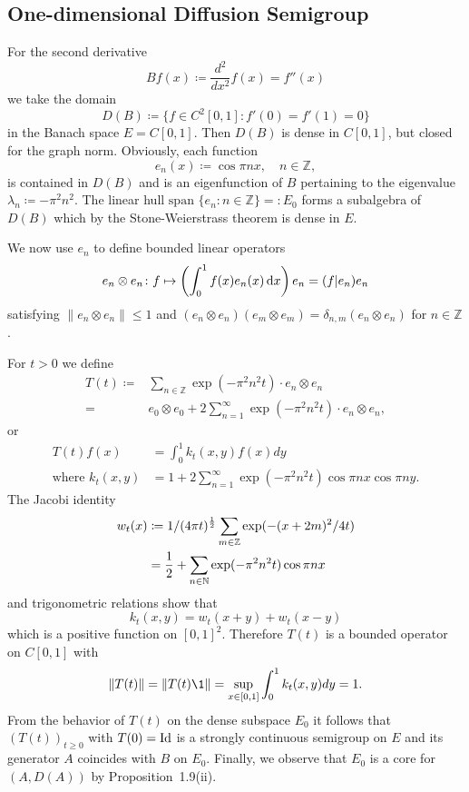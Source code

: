 \subsection{One-dimensional Diffusion Semigroup}\label{subsec:a1-2.7}%
For the second derivative 
\[
    Bf(x) \coloneqq \frac{d^{2}}{dx^{2}}f(x) = f''(x)
\]
we take the domain
\[
    D(B) \coloneqq \{f \in C^{2}\left[ 0,1 \right] \colon f'(0) = f'(1) = 0\}
\]
in the Banach space $E = C\left[ 0,1 \right]$.
Then $D(B)$ is dense in $C\left[ 0,1 \right]$, but closed for the graph norm.
Obviously, each function
\[
    e_{n}(x) \coloneqq \cos \pi nx, \quad n \in \mathbb{Z},
\]
is contained in $D(B)$ and is an eigenfunction of $B$ pertaining to the eigenvalue $\lambda_{n} \coloneqq -\pi^{2}n^{2}$.
The linear hull $\text{span }\{e_{n} \colon n \in \mathbb{Z}\} = \colon E_{0}$ forms a subalgebra of $D(B)$ which by the Stone-Weierstrass theorem is dense in $E$.

We now use $e_{n}$ to define bounded linear operators 
\[
	e_{n} \otimes e_{n} \colon f \mapsto \left(\int_{0}^{1} f(x)e_{n}(x) \dx \right)e_{n} 
		= ( f | e_{n} ) e_{n} %
\]
satisfying $\|e_{n} \otimes e_{n}\| \leq 1$ and
$(e_{n} \otimes e_{n})(e_{m} \otimes e_{m}) = \delta_{n,m}(e_{n} \otimes e_{n})$ for $n \in \mathbb{Z}$.

For $t > 0$ we define
\begin{align*}
T(t) \coloneqq{}& \sum_{n \in \mathbb{Z}} \exp(-\pi^{2}n^{2}t) \cdot e_{n} \otimes e_{n} \\
		={}& e_{0} \otimes e_{0} + 2\sum_{n=1}^{\infty} \exp(-\pi^{2}n^{2}t) \cdot e_{n} \otimes e_{n},
\end{align*}
or
\begin{align*}
    T(t)f(x) &= \int_{0}^{1} k_{t}(x,y)f(x)dy \\
    \text{where } k_{t}(x,y) &= 1 + 2\sum_{n=1}^{\infty} \exp(-\pi^{2}n^{2}t) \cos\pi nx \cos\pi ny .
\end{align*}
The Jacobi identity
\begin{align*}
    w_{t}(x) &\coloneqq 1/(4\pi t)^{\frac{1}{2}} \sum_{m \in \mathbb{Z}} \exp(-(x+2m)^{2}/4t) \\
    &= \frac{1}{2} + \sum_{n \in \mathbb{N}} \exp(-\pi^{2}n^{2}t) \cos\pi nx
\end{align*}
and trigonometric relations show that
\[
    k_{t}(x,y) = w_{t}(x+y) + w_{t}(x-y)
\]
which is a positive function on $\left[ 0,1 \right]^{2}$.
Therefore $T(t)$ is a bounded operator on $C\left[ 0,1 \right]$ with
\[
    \|T(t)\| = \|T(t)\1\| = \sup_{x \in \left[ 0,1 \right]} \int_{0}^{1} k_{t}(x,y)dy = 1 .
\]
From the behavior of $T(t)$ on the dense subspace $E_{0}$ it follows that $(T(t))_{t \geq 0}$ with $T(0) = \operatorname{Id}$ is a strongly continuous semigroup on $E$ and its generator $A$ coincides with $B$ on $E_{0}$.
Finally, we observe that $E_{0}$ is a core for $(A,D(A))$ by Proposition~1.9(ii).

